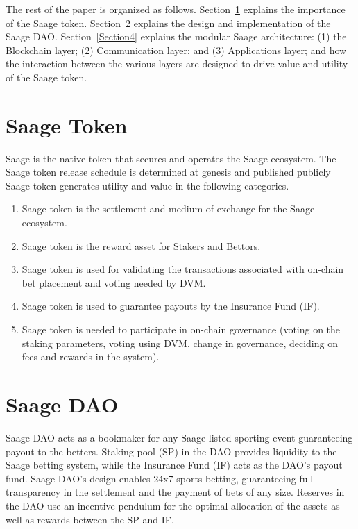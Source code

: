 \documentclass[%
 aapm,
 mph,%
 amsmath,amssymb,
 reprint,%
]{revtex4-2}
\begin{document}
The rest of the paper is organized as follows. Section~\ref{Section2} explains the importance of the Saage token. Section~\ref{Section3} explains the design and implementation of the Saage DAO. Section~\ref{Section4} explains the modular Saage architecture: (1) the Blockchain layer; (2) Communication layer; and (3) Applications layer; and how the interaction between the various layers are designed to drive value and utility of the Saage token. 

\section{Saage Token}\label{Section2}
Saage is the native token that secures and operates the Saage ecosystem. The Saage token release schedule is determined at genesis and published publicly
Saage token generates utility and value in the following categories.

\begin{enumerate}
\item Saage token is the settlement and medium of exchange for the Saage ecosystem.
\item Saage token is the reward asset for Stakers and Bettors.  
\item Saage token is used for validating the transactions associated with on-chain bet placement and voting needed by DVM. 
\item Saage token is used to guarantee payouts by the Insurance Fund (IF). 
\item Saage token is needed to participate in on-chain governance (voting on the staking parameters, voting using DVM, change in governance, deciding on fees and rewards in the system). 
\end{enumerate}

\section{Saage DAO} \label{Section3}

Saage DAO acts as a bookmaker for any Saage-listed sporting event guaranteeing payout to the betters. Staking pool (SP) in the DAO provides liquidity to the Saage betting system, while the Insurance Fund (IF) acts as the DAO’s payout fund.   Saage DAO’s design enables 24x7 sports betting, guaranteeing full transparency in the settlement and the payment of bets of any size. Reserves in the DAO use an incentive pendulum for the optimal allocation of the assets as well as rewards between the SP and IF. 
\end{document}
